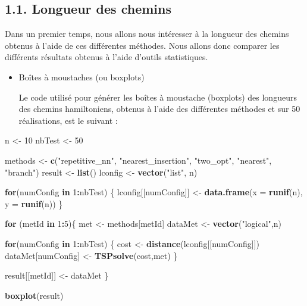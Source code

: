 \documentclass[
]{article}
\newenvironment{Shaded}{\begin{snugshade}}{\end{snugshade}}
\newcommand{\ControlFlowTok}[1]{\textcolor[rgb]{0.13,0.29,0.53}{\textbf{#1}}}
\newcommand{\DataTypeTok}[1]{\textcolor[rgb]{0.13,0.29,0.53}{#1}}
\newcommand{\DecValTok}[1]{\textcolor[rgb]{0.00,0.00,0.81}{#1}}
\newcommand{\KeywordTok}[1]{\textcolor[rgb]{0.13,0.29,0.53}{\textbf{#1}}}
\newcommand{\NormalTok}[1]{#1}
\newcommand{\OperatorTok}[1]{\textcolor[rgb]{0.81,0.36,0.00}{\textbf{#1}}}
\newcommand{\StringTok}[1]{\textcolor[rgb]{0.31,0.60,0.02}{#1}}
\begin{document}
\hypertarget{longueur-des-chemins}{%
\subsection{1.1. Longueur des chemins}\label{longueur-des-chemins}}

Dans un premier temps, nous allons nous intéresser à la longueur des
chemins obtenus à l'aide de ces différentes méthodes. Nous allons donc
comparer les différents résultats obtenus à l'aide d'outils
statistiques.

\begin{itemize}
\item
  Boîtes à moustaches (ou boxplots)

  Le code utilisé pour générer les boîtes à moustache (boxplots) des
  longueurs des chemins hamiltoniens, obtenus à l'aide des différentes
  méthodes et sur 50 réalisations, est le suivant :
\end{itemize}

\begin{Shaded}
\begin{Highlighting}[]
\NormalTok{  n <-}\StringTok{ }\DecValTok{10}
\NormalTok{  nbTest <-}\StringTok{ }\DecValTok{50}

\NormalTok{  methods <-}\StringTok{ }\KeywordTok{c}\NormalTok{(}\StringTok{"repetitive_nn"}\NormalTok{, }\StringTok{"nearest_insertion"}\NormalTok{, }\StringTok{"two_opt"}\NormalTok{, }\StringTok{"nearest"}\NormalTok{, }\StringTok{"branch"}\NormalTok{)}
\NormalTok{  result  <-}\StringTok{ }\KeywordTok{list}\NormalTok{()}
\NormalTok{  lconfig <-}\StringTok{ }\KeywordTok{vector}\NormalTok{(}\StringTok{"list"}\NormalTok{, n)}

  \ControlFlowTok{for}\NormalTok{(numConfig }\ControlFlowTok{in} \DecValTok{1}\OperatorTok{:}\NormalTok{nbTest) \{}
\NormalTok{    lconfig[[numConfig]] <-}\StringTok{ }\KeywordTok{data.frame}\NormalTok{(}\DataTypeTok{x =} \KeywordTok{runif}\NormalTok{(n), }\DataTypeTok{y =} \KeywordTok{runif}\NormalTok{(n))}
\NormalTok{  \}}

  \ControlFlowTok{for}\NormalTok{ (metId }\ControlFlowTok{in} \DecValTok{1}\OperatorTok{:}\DecValTok{5}\NormalTok{)\{}
\NormalTok{    met     <-}\StringTok{ }\NormalTok{methods[metId]}
\NormalTok{    dataMet <-}\StringTok{ }\KeywordTok{vector}\NormalTok{(}\StringTok{"logical"}\NormalTok{,n)}

    \ControlFlowTok{for}\NormalTok{(numConfig }\ControlFlowTok{in} \DecValTok{1}\OperatorTok{:}\NormalTok{nbTest) \{}
\NormalTok{      cost               <-}\StringTok{ }\KeywordTok{distance}\NormalTok{(lconfig[[numConfig]])}
\NormalTok{      dataMet[numConfig] <-}\StringTok{ }\KeywordTok{TSPsolve}\NormalTok{(cost,met)}
\NormalTok{    \}}

\NormalTok{    result[[metId]] <-}\StringTok{ }\NormalTok{dataMet}
\NormalTok{  \}}

  \KeywordTok{boxplot}\NormalTok{(result)}
\end{Highlighting}
\end{Shaded}
\end{document}

